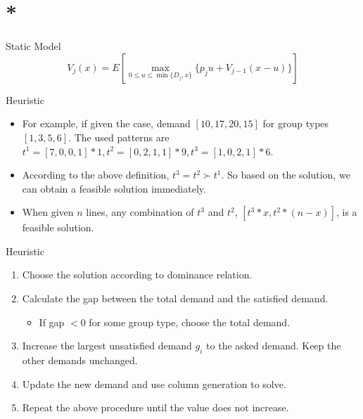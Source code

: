 
\section{*}

\begin{frame}
  Static Model
  \begin{equation*}
      V_{j}(x) = E\left[\max_{0\leq u \leq \min\{D_j,x\}} \{p_ju + V_{j-1}(x-u)\}\right]
      \end{equation*}
\end{frame}

\begin{frame}{Heuristic}
  \begin{itemize}
    \item For example, if given the case, demand $[10,17,20,15]$ for group types $[1,3,5,6]$.
    The used patterns are $t^1 = [7,0,0,1]*1, t^2 = [0,2,1,1]*9, t^3 = [1,0,2,1]*6$.
    \item According to the above definition, $t^3 = t^2 \succ t^1$. So based on the solution, we can obtain a feasible solution immediately.
    \item When given $n$ lines, any combination of $t^3$ and $t^2$, $[t^3*x,t^2*(n-x)]$, is a feasible solution.
  \end{itemize}
\end{frame}

\begin{frame}{Heuristic}
  \begin{enumerate}
    \item Choose the solution according to dominance relation.
    \item Calculate the gap between the total demand and the satisfied demand.
    \begin{itemize}
      \item If gap $<0$ for some group type, choose the total demand.
    \end{itemize}
    \item Increase the largest unsatisfied demand $g_i$ to the asked demand. Keep the other  demands unchanged.
    \item Update the new demand and use column generation to solve.
    \item Repeat the above procedure until the value does not increase.
    \end{enumerate}
\end{frame}


